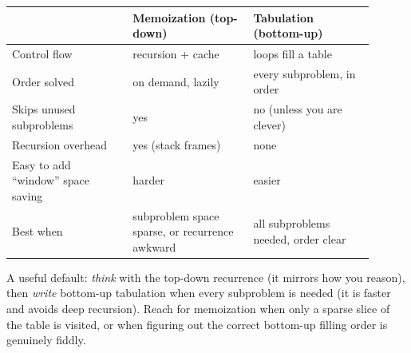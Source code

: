 \begin{center}
\begin{tabular}{p{0.30\linewidth} p{0.30\linewidth} p{0.30\linewidth}}
\toprule
 & \textbf{Memoization (top-down)} & \textbf{Tabulation (bottom-up)} \\
\midrule
Control flow & recursion + cache & loops fill a table \\
Order solved & on demand, lazily & every subproblem, in order \\
Skips unused subproblems & yes & no (unless you are clever) \\
Recursion overhead & yes (stack frames) & none \\
Easy to add ``window'' space saving & harder & easier \\
Best when & subproblem space sparse, or recurrence awkward & all subproblems needed, order clear \\
\bottomrule
\end{tabular}
\end{center}

\begin{focusbox}
A useful default: \emph{think} with the top-down recurrence (it mirrors how you
reason), then \emph{write} bottom-up tabulation when every subproblem is needed
(it is faster and avoids deep recursion). Reach for memoization when only a
sparse slice of the table is visited, or when figuring out the correct
bottom-up filling order is genuinely fiddly.
\end{focusbox}


